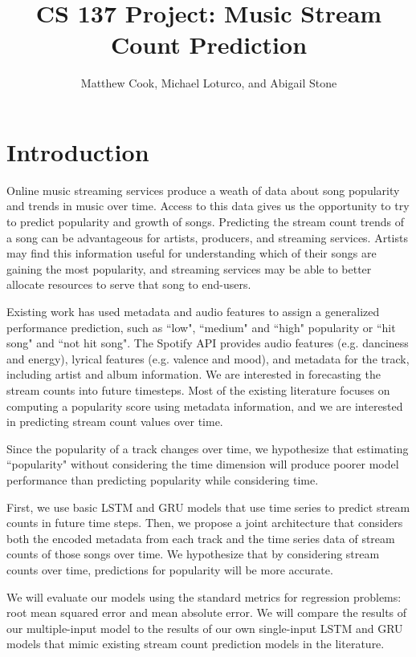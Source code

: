 \documentclass[11pt]{article}
\title{CS 137 Project: Music Stream Count Prediction}
\author{Matthew Cook, Michael Loturco, and Abigail Stone}
\date{}
\begin{document}
\maketitle

\section{Introduction}

Online music streaming services produce a weath of data about song popularity and trends in music over time. Access to this data gives us the opportunity to try to predict popularity and growth of songs. Predicting the stream count trends of a song can be advantageous for artists, producers, and streaming services. Artists may find this information useful for understanding which of their songs are gaining the most popularity, and streaming services may be able to better allocate resources to serve that song to end-users.

Existing work \cite{araujo_predicting_2019, martin-gutierrez_multimodal_2020} has used metadata and audio features to assign a generalized performance prediction, such as ``low", ``medium" and ``high" popularity or ``hit song" and ``not hit song". The Spotify API \cite{noauthor_spotify_nodate} provides audio features (e.g. danciness and energy), lyrical features (e.g. valence and mood), and metadata for the track, including artist and album information. We are interested in forecasting the stream counts into future timesteps. Most of the existing literature focuses on computing a popularity score using metadata information, and we are interested in predicting stream count values over time. 

Since the popularity of a track changes over time, we hypothesize that estimating ``popularity" without considering the time dimension will produce poorer model performance than predicting popularity while considering time. 

First, we use basic LSTM and GRU models that use time series to predict stream counts in future time steps. Then, we propose a joint architecture that considers both the encoded metadata from each track and the time series data of stream counts of those songs over time. We hypothesize that by considering stream counts over time, predictions for popularity will be more accurate. 

We will evaluate our models using the standard metrics for regression problems: root mean squared error and mean absolute error. We will compare the results of our multiple-input model to the results of our own single-input LSTM and GRU models that mimic existing stream count prediction models in the literature.
\end{document}
